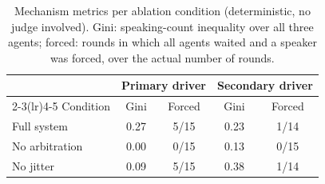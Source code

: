 \begin{table}[t]
\centering
\caption{Mechanism metrics per ablation condition (deterministic, no
judge involved). Gini: speaking-count inequality over all three agents;
forced: rounds in which all agents waited and a speaker was forced, over
the actual number of rounds.}
\label{tab:mechanism}
\small
\begin{tabular}{@{}lcccc@{}}
\toprule
& \multicolumn{2}{c}{Primary driver} & \multicolumn{2}{c}{Secondary driver} \\
\cmidrule(lr){2-3}\cmidrule(lr){4-5}
Condition & Gini & Forced & Gini & Forced \\
\midrule
Full system & 0.27 & 5/15 & 0.23 & 1/14 \\
No arbitration & 0.00 & 0/15 & 0.13 & 0/15 \\
No jitter & 0.09 & 5/15 & 0.38 & 1/14 \\
\bottomrule
\end{tabular}
\end{table}
